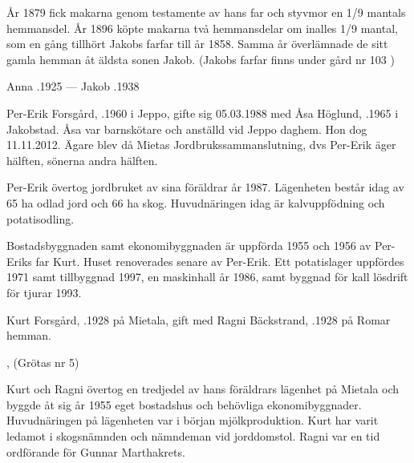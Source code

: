 År 1879 fick makarna genom testamente av hans far och styvmor en 1/9 mantals hemmansdel. År 1896 köpte makarna två hemmansdelar om inalles 1/9 mantal, som en gång tillhört Jakobs farfar till år 1858. Samma år överlämnade de sitt gamla hemman åt äldsta sonen Jakob. (Jakobs farfar finns under gård nr 103 )

Anna .1925  ---  Jakob .1938






Per-Erik Forsgård, .1960 i Jeppo, gifte sig 05.03.1988 med Åsa Höglund, .1965 i Jakobstad. Åsa var barnskötare och anställd vid Jeppo daghem. Hon dog 11.11.2012. Ägare blev då Mietas Jordbrukssammanslutning, dvs Per-Erik äger hälften, sönerna andra hälften.
\begin{jhchildren}
  \item {}
  \item {}
\end{jhchildren}

Per-Erik övertog jordbruket av sina föräldrar år 1987. Lägenheten består idag av 65 ha odlad jord och 66 ha skog. Huvudnäringen idag är kalvuppfödning och potatisodling.

Bostadsbyggnaden samt ekonomibyggnaden är uppförda 1955 och 1956 av Per-Eriks far Kurt. Huset renoverades senare av Per-Erik. Ett potatislager uppfördes 1971 samt tillbyggnad 1997, en maskinhall år 1986, samt byggnad för kall lösdrift för tjurar 1993.


Kurt Forsgård, .1928 på Mietala, gift med Ragni Bäckstrand, .1928 på Romar hemman.
\begin{jhchildren}
  \item {}, (Grötas nr 5)
  \item {}
\end{jhchildren}

Kurt och Ragni övertog en tredjedel av hans föräldrars lägenhet på Mietala och byggde åt sig år 1955 eget bostadshus och behövliga ekonomibyggnader. Huvudnäringen på lägenheten var i början mjölkproduktion. Kurt har varit ledamot i skogsnämnden och nämndeman vid jorddomstol. Ragni var en tid ordförande för Gunnar Marthakrets.

